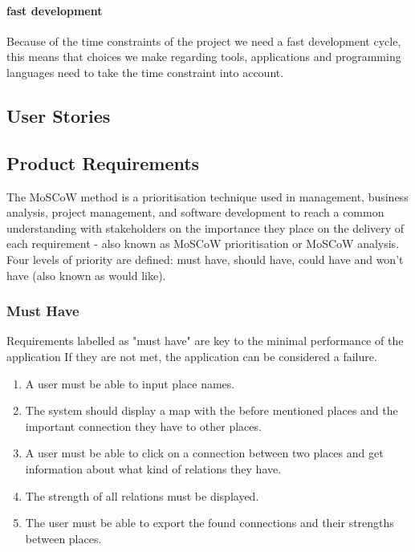 \paragraph{fast development} Because of the time constraints of the project we need a fast development cycle, this means that choices we make regarding tools, applications and programming languages need to take the time constraint into account.

\subsection{User Stories}


\subsection{Product Requirements}\label{sec:reqs}
The MoSCoW method is a prioritisation technique used in management, business analysis, project management, and software development to reach a common understanding with stakeholders on the importance they place on the delivery of each requirement - also known as MoSCoW prioritisation or MoSCoW analysis. Four levels of priority are defined: must have, should have, could have and won't have (also known as would like).


\subsubsection {Must Have}
Requirements labelled as "must have" are key to the minimal performance of the application If they are not met, the application can be considered a failure.

\begin{enumerate}
    \item A user must be able to input place names.
    \item The system should display a map with the before mentioned places and the important connection they have to other places.
    \item A user must be able to click on a connection between two places and get information about what kind of relations they have.
    \item The strength of all relations must be displayed.
    \item The user must be able to export the found connections and their strengths between places.
\end{enumerate}
 
